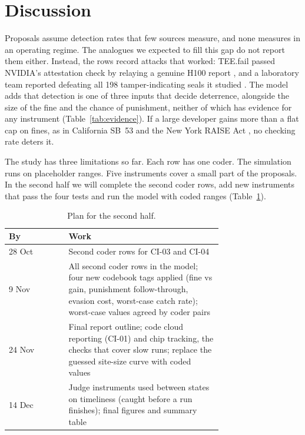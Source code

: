 \documentclass[11pt,a4paper]{article}
\newif\ifhighlight
\newcommand{\addtext}[1]{\ifhighlight{\color{newtext}#1}\else#1\fi}
\newenvironment{addedblock}{\ifhighlight\color{newtext}\fi}{}
\begin{document}
\section{Discussion}
Proposals assume detection rates that few sources measure, and none measures in an operating regime. The analogues we expected to fill this gap do not report them either. Instead, the rows record attacks that worked: TEE.fail passed NVIDIA's attestation check by relaying a genuine H100 report \cite{chuang2025}, and a laboratory team reported defeating all 198 tamper-indicating seals it studied \cite{johnston2002}. \addtext{The model adds that detection is one of three inputs that decide deterrence, alongside the size of the fine and the chance of punishment, neither of which has evidence for any instrument (Table~\ref{tab:evidence}). If a large developer gains more than a flat cap on fines, as in California SB~53 \cite{sb53} and the New York RAISE Act \cite{raise}, no checking rate deters it.}

The study has three limitations so far. Each row has one coder. The simulation runs on placeholder ranges. Five instruments cover a small part of the proposals. In the second half we will complete the second coder rows, add new instruments that pass the four tests and run the model with coded ranges \addtext{(Table~\ref{tab:plan})}.

\begin{table}[H]
\begin{addedblock}
\centering
\footnotesize
\begin{tabular}{@{}lp{0.72\linewidth}@{}}
\toprule
By & Work \\
\midrule
28 Oct & Second coder rows for CI-03 and CI-04 \\
9 Nov & All second coder rows in the model; four new codebook tags applied (fine vs gain, punishment follow-through, evasion cost, worst-case catch rate); worst-case values agreed by coder pairs \\
24 Nov & Final report outline; code cloud reporting (CI-01) and chip tracking, the checks that cover slow runs; replace the guessed site-size curve with coded values \\
14 Dec & Judge instruments used between states on timeliness (caught before a run finishes); final figures and summary table \\
\bottomrule
\end{tabular}
\caption{Plan for the second half.}
\label{tab:plan}
\end{addedblock}
\end{table}
\end{document}
